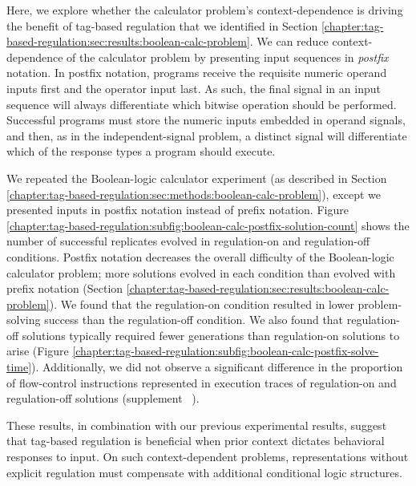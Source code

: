 Here, we explore whether the calculator problem's context-dependence is driving the benefit of tag-based regulation that we identified in Section \ref{chapter:tag-based-regulation:sec:results:boolean-calc-problem}.
We can reduce context-dependence of the calculator problem by presenting input sequences in \textit{postfix} notation. 
In postfix notation, programs receive the requisite numeric operand inputs first and the operator input last. 
As such, the final signal in an input sequence will always differentiate which bitwise operation should be performed.
Successful programs must store the numeric inputs embedded in operand signals, and then, as in the independent-signal problem, a distinct signal will differentiate which of the response types a program should execute. 



We repeated the Boolean-logic calculator experiment (as described in Section \ref{chapter:tag-based-regulation:sec:methods:boolean-calc-problem}), except we presented inputs in postfix notation instead of prefix notation. 
Figure \ref{chapter:tag-based-regulation:subfig:boolean-calc-postfix-solution-count} shows the number of successful replicates evolved in regulation-on and regulation-off conditions.
Postfix notation decreases the overall difficulty of the Boolean-logic calculator problem; more solutions evolved in each condition than evolved with prefix notation (Section \ref{chapter:tag-based-regulation:sec:results:boolean-calc-problem}).
We found that the regulation-on condition resulted in lower problem-solving success than the regulation-off condition. 
We also found that regulation-off solutions typically required fewer generations than regulation-on solutions to arise (Figure \ref{chapter:tag-based-regulation:subfig:boolean-calc-postfix-solve-time}).
Additionally, we did not observe a significant difference in the proportion of flow-control instructions represented in execution traces of regulation-on and regulation-off solutions (supplement \supSecBooleanCalcPostfixAnalysis\ \citep{tag_regulation_supplement_2021}). 

These results, in combination with our previous experimental results, suggest that tag-based regulation is beneficial when prior context dictates behavioral responses to input.
On such context-dependent problems, representations without explicit regulation must compensate with additional conditional logic structures. 